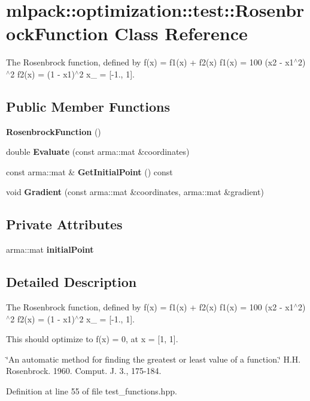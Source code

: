 \section{mlpack\-:\-:optimization\-:\-:test\-:\-:Rosenbrock\-Function Class Reference}
\label{classmlpack_1_1optimization_1_1test_1_1RosenbrockFunction}


The Rosenbrock function, defined by f(x) = f1(x) + f2(x) f1(x) = 100 (x2 -\/ x1$^\wedge$2)$^\wedge$2 f2(x) = (1 -\/ x1)$^\wedge$2 x\-\_ = [-\/1., 1].  


\subsection*{Public Member Functions}
\begin{DoxyCompactItemize}
\item 
{\bf Rosenbrock\-Function} ()
\item 
double {\bf Evaluate} (const arma\-::mat \&coordinates)
\item 
const arma\-::mat \& {\bf Get\-Initial\-Point} () const 
\item 
void {\bf Gradient} (const arma\-::mat \&coordinates, arma\-::mat \&gradient)
\end{DoxyCompactItemize}
\subsection*{Private Attributes}
\begin{DoxyCompactItemize}
\item 
arma\-::mat {\bf initial\-Point}
\end{DoxyCompactItemize}


\subsection{Detailed Description}
The Rosenbrock function, defined by f(x) = f1(x) + f2(x) f1(x) = 100 (x2 -\/ x1$^\wedge$2)$^\wedge$2 f2(x) = (1 -\/ x1)$^\wedge$2 x\-\_ = [-\/1., 1]. 

This should optimize to f(x) = 0, at x = [1, 1].

\char`\"{}\-An automatic method for finding the greatest or least value of a function.\char`\"{} H.\-H. Rosenbrock. 1960. Comput. J. 3., 175-\/184. 

Definition at line 55 of file test\-\_\-functions.\-hpp.



